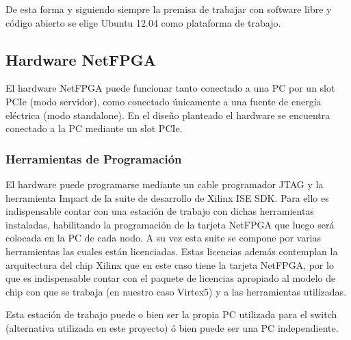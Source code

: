 De esta forma y siguiendo siempre la premisa de trabajar con software libre y c\'odigo abierto se elige Ubuntu 12.04 como plataforma de trabajo.

\subsection{Hardware NetFPGA}

El hardware NetFPGA puede funcionar tanto conectado a una PC por un slot PCIe (modo servidor), como conectado \'unicamente a una fuente de energ\'ia el\'ectrica (modo standalone). En el dise\~no planteado el hardware se encuentra conectado a la PC mediante un slot PCIe.


\subsubsection{Herramientas de Programaci\'on}

El hardware puede programarse mediante un cable programador JTAG y la herramienta Impact de la suite de desarrollo de Xilinx ISE SDK. Para ello es indispensable contar con una estaci\'on de trabajo con dichas herramientas instaladas, habilitando la programaci\'on  de la tarjeta NetFPGA que luego ser\'a colocada en la PC de cada nodo. A su vez esta suite se compone por varias herramientas las cuales están licenciadas. Estas licencias adem\'as contemplan la arquitectura del chip Xilinx que en este caso tiene la tarjeta NetFPGA, por lo que es indispensable contar con el paquete de licencias apropiado al modelo de chip con que se trabaja (en nuestro caso Virtex5) y a las herramientas utilizadas. 

Esta estaci\'on de trabajo puede o bien ser la propia PC utilizada para el switch (alternativa utilizada en este proyecto) \'o bien puede ser una PC independiente.


